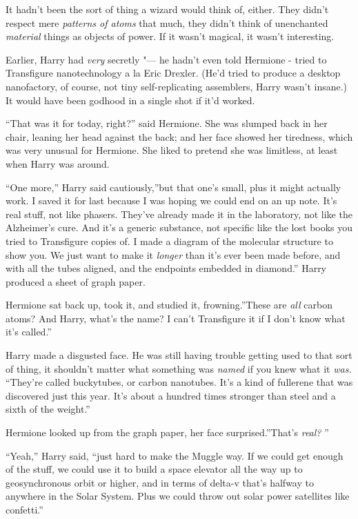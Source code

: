 It hadn't been the sort of thing a wizard would think of, either. They
didn't respect mere \emph{patterns of atoms} that much, they didn't
think of unenchanted \emph{material} things as objects of power. If it
wasn't magical, it wasn't interesting.

Earlier, Harry had \emph{very} secretly "--- he hadn't even told Hermione -
tried to Transfigure nanotechnology a la Eric Drexler. (He'd tried to
produce a desktop nanofactory, of course, not tiny self-replicating
assemblers, Harry wasn't insane.) It would have been godhood in a single
shot if it'd worked.

``That was it for today, right?'' said Hermione. She was slumped back in
her chair, leaning her head against the back; and her face showed her
tiredness, which was very unusual for Hermione. She liked to pretend she
was limitless, at least when Harry was around.

``One more,'' Harry said cautiously,''but that one's small, plus it
might actually work. I saved it for last because I was hoping we could
end on an up note. It's real stuff, not like phasers. They've already
made it in the laboratory, not like the Alzheimer's cure. And it's a
generic substance, not specific like the lost books you tried to
Transfigure copies of. I made a diagram of the molecular structure to
show you. We just want to make it \emph{longer} than it's ever been made
before, and with all the tubes aligned, and the endpoints embedded in
diamond.'' Harry produced a sheet of graph paper.

Hermione sat back up, took it, and studied it, frowning.''These are
\emph{all} carbon atoms? And Harry, what's the name? I can't Transfigure
it if I don't know what it's called.''

Harry made a disgusted face. He was still having trouble getting used to
that sort of thing, it shouldn't matter what something was \emph{named}
if you knew what it \emph{was.} ``They're called buckytubes, or carbon
nanotubes. It's a kind of fullerene that was discovered just this year.
It's about a hundred times stronger than steel and a sixth of the
weight.''

Hermione looked up from the graph paper, her face surprised.''That's
\emph{real?} ''

``Yeah,'' Harry said, ``just hard to make the Muggle way. If we could
get enough of the stuff, we could use it to build a space elevator all
the way up to geosynchronous orbit or higher, and in terms of delta-v
that's halfway to anywhere in the Solar System. Plus we could throw out
solar power satellites like confetti.''

